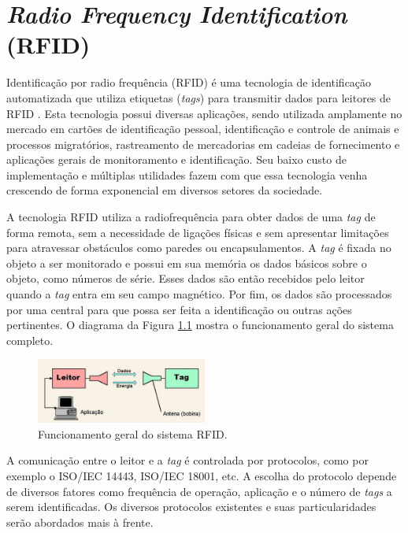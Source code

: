 \chapter{\textit{Radio Frequency Identification} (RFID)}


Identificação por radio frequência (RFID) é uma tecnologia de identificação automatizada que utiliza etiquetas (\textit{tags}) para transmitir dados para leitores de RFID \cite{li2009} . Esta tecnologia possui diversas aplicações, sendo utilizada amplamente no mercado em cartões de identificação pessoal, identificação e controle de animais e processos migratórios, rastreamento de mercadorias em cadeias de fornecimento e aplicações gerais de monitoramento e identificação. Seu baixo custo de implementação e múltiplas utilidades fazem com que essa tecnologia venha crescendo de forma exponencial em diversos setores da sociedade. 

A tecnologia RFID utiliza a radiofrequência para obter dados de uma \textit{tag} de forma remota, sem a necessidade de ligações físicas e sem apresentar limitações para atravessar obstáculos como paredes ou encapsulamentos. 
A \textit{tag} é fixada no objeto a ser monitorado e possui em sua memória os dados básicos sobre o objeto, como números de série. Esses dados são então recebidos pelo leitor quando a \textit{tag}  entra em seu campo magnético. Por fim, os dados são processados por uma central para que possa ser feita a identificação ou outras ações pertinentes. O diagrama da Figura \ref{rfid-geral} mostra o funcionamento geral do sistema completo.

\begin{figure}[h!]
  \centering
  \includegraphics[width=0.5\textwidth]{figuras/image002.jpg}
  \caption{Funcionamento geral do sistema RFID.\cite{Sangreman}}
  \label{rfid-geral}
\end{figure}

A comunicação entre o leitor e a \textit{tag} é controlada por protocolos, como por exemplo o ISO/IEC 14443, ISO/IEC 18001, etc. A escolha do protocolo depende de diversos fatores como frequência de operação, aplicação e o número de \textit{tags} a serem identificadas. Os diversos protocolos existentes e suas particularidades serão abordados mais à frente.

